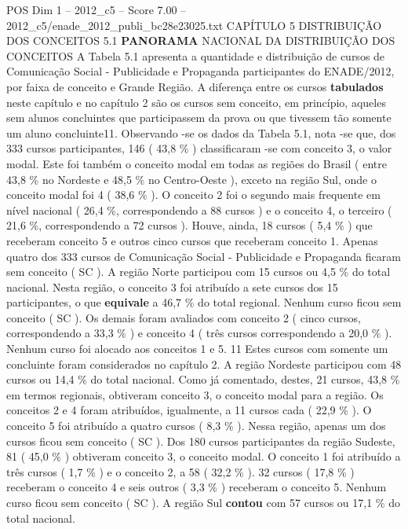 \begin{textsample}{POS Dim 1 – 2012\_c5 – Score 7.00 – 2012\_c5/enade\_2012\_publi\_bc28e23025.txt}  \label{ex:f1_pos_112}
CAPÍTULO 5 DISTRIBUIÇÃO DOS CONCEITOS 5.1 \textbf{PANORAMA} NACIONAL DA DISTRIBUIÇÃO DOS CONCEITOS A Tabela 5.1 apresenta a quantidade e distribuição de cursos de Comunicação Social - Publicidade e Propaganda participantes do ENADE/2012, por faixa de conceito e Grande Região.
A diferença entre os cursos \textbf{tabulados} neste capítulo e no capítulo 2 são os cursos sem conceito, em princípio, aqueles sem alunos concluintes que participassem da prova ou que tivessem tão somente um aluno concluinte11.
Observando -se os dados da Tabela 5.1, nota -se que, dos 333 cursos participantes, 146 ( 43,8 \% ) classificaram -se com conceito 3, o valor modal.
Este foi também o conceito modal em todas as regiões do Brasil ( entre 43,8 \% no Nordeste e 48,5 \% no Centro-Oeste ), exceto na região Sul, onde o conceito modal foi 4 ( 38,6 \% ).
O conceito 2 foi o segundo mais frequente em nível nacional ( 26,4 \%, correspondendo a 88 cursos ) e o conceito 4, o terceiro ( 21,6 \%, correspondendo a 72 cursos ).
Houve, ainda, 18 cursos ( 5,4 \% ) que receberam conceito 5 e outros cinco cursos que receberam conceito 1.
Apenas quatro dos 333 cursos de Comunicação Social - Publicidade e Propaganda ficaram sem conceito ( SC ).
A região Norte participou com 15 cursos ou 4,5 \% do total nacional.
Nesta região, o conceito 3 foi atribuído a sete cursos dos 15 participantes, o que \textbf{equivale} a 46,7 \% do total regional.
Nenhum curso ficou sem conceito ( SC ).
Os demais foram avaliados com conceito 2 ( cinco cursos, correspondendo a 33,3 \% ) e conceito 4 ( três cursos correspondendo a 20,0 \% ).
Nenhum curso foi alocado aos conceitos 1 e 5. 11 Estes cursos com somente um concluinte foram considerados no capítulo 2.
A região Nordeste participou com 48 cursos ou 14,4 \% do total nacional.
Como já comentado, destes, 21 cursos, 43,8 \% em termos regionais, obtiveram conceito 3, o conceito modal para a região.
Os conceitos 2 e 4 foram atribuídos, igualmente, a 11 cursos cada ( 22,9 \% ).
O conceito 5 foi atribuído a quatro cursos ( 8,3 \% ).
Nessa região, apenas um dos cursos ficou sem conceito ( SC ).
Dos 180 cursos participantes da região Sudeste, 81 ( 45,0 \% ) obtiveram conceito 3, o conceito modal.
O conceito 1 foi atribuído a três cursos ( 1,7 \% ) e o conceito 2, a 58 ( 32,2 \% ). 32 cursos ( 17,8 \% ) receberam o conceito 4 e seis outros ( 3,3 \% ) receberam o conceito 5.
Nenhum curso ficou sem conceito ( SC ).
A região Sul \textbf{contou} com 57 cursos ou 17,1 \% do total nacional.

\end{textsample}
